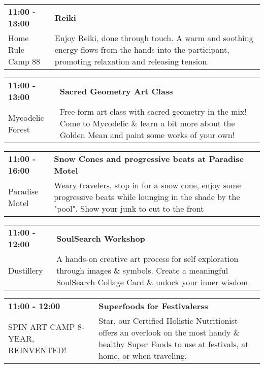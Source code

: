 \begin{tabular}{ p{1in} p{2.2in} }
    \textbf{11:00 - 13:00} & \textbf{Reiki } \\
    Home Rule \newline Camp 88 & Enjoy Reiki, done through touch. A warm and soothing energy flows from the hands into the participant, promoting relaxation and releasing tension. \\
    \hline 
\end{tabular}
    
\begin{tabular}{ p{1in} p{2.2in} }
    \textbf{11:00 - 13:00} & \textbf{Sacred Geometry Art Class} \\
    Mycodelic Forest \newline  & Free-form art class with sacred geometry in the mix! Come to Mycodelic \& learn a bit more about the Golden Mean and paint some works of your own! \\
    \hline 
\end{tabular}
    
\begin{tabular}{ p{1in} p{2.2in} }
    \textbf{11:00 - 16:00} & \textbf{Snow Cones and progressive beats at Paradise Motel} \\
    Paradise Motel \newline  & Weary travelers, stop in for a snow cone, enjoy some progressive beats while lounging in the shade by the "pool".   Show your junk to cut to the front \\
    \hline 
\end{tabular}
    
\begin{tabular}{ p{1in} p{2.2in} }
    \textbf{11:00 - 12:00} & \textbf{SoulSearch Workshop} \\
    Dustillery \newline  & A hands-on creative art process for self exploration through images \& symbols. Create a meaningful SoulSearch Collage Card \& unlock your inner wisdom. \\
    \hline 
\end{tabular}
    
\begin{tabular}{ p{1in} p{2.2in} }
    \textbf{11:00 - 12:00} & \textbf{Superfoods for Festivalerss} \\
    SPIN ART CAMP 8-YEAR, REINVENTED! \newline  & Star, our Certified Holistic Nutritionist offers an overlook on the most handy \& healthy Super Foods to use at festivals, at home, or when traveling. \\
    \hline 
\end{tabular}
    
